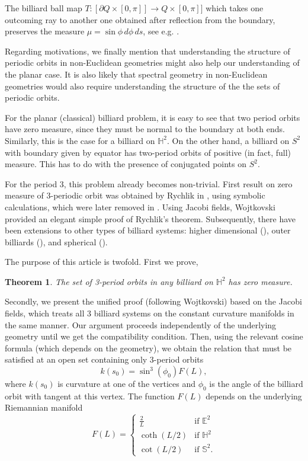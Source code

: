 \documentclass[11pt]{article}
\theoremstyle{plain}
\newtheorem{theorem}{Theorem}[section]
\theoremstyle{definition}
\begin{document}
The billiard ball map $T: [\partial Q\times [0,\pi]] \rightarrow Q\times [0,\pi]]$ which takes one outcoming ray to
another one obtained after reflection from the boundary, preserves the measure $\mu = \sin \phi\, d\phi \, ds$, see e.g.
\cite{birkhoff}.

Regarding motivations, we finally mention that understanding the structure of periodic orbits in non-Euclidean geometries
might also help our understanding of the planar case. It is also likely that spectral geometry in non-Euclidean
geometries would also require understanding the structure of the the sets of periodic orbits.


For the planar (classical) billiard problem, it is easy to see that two period orbits have zero measure,
since they must be normal to the boundary at both ends. Similarly, this is the case for a billiard on ${\mathbb H^2}$.
On the other hand, a billiard on $S^2$ with boundary given by equator has two-period orbits of positive (in fact, full)
measure. This has to do with the presence of conjugated points on $S^2$.

For the period 3, this problem already becomes non-trivial. First result on zero measure of 3-periodic orbit was
obtained by Rychlik in \cite{rychlik}, using symbolic calculations, which were later removed in \cite{stojanov}.
 Using Jacobi fields, Wojtkovski provided an elegant simple proof of Rychlik's theorem. Subsequently, there have been
extensions to other types of billiard systems: higher dimensional (\cite{vorobets}),
outer billiards (\cite{genin,tumanov}), and spherical (\cite{ymb}).

The purpose of this article is twofold. First we prove,

\begin{theorem}
The set of 3-period orbits in any billiard on ${\mathbb H^2}$ has zero measure.
\end{theorem}

Secondly, we present the unified proof (following Wojtkovski) based on the Jacobi fields,
which treats all 3 billiard systems on the constant curvature manifolds in the same manner.
Our argument proceeds independently of the underlying geometry until we get the compatibility
condition. Then, using the relevant cosine formula (which depends on the geometry), we obtain
the relation that must be satisfied at an open set containing only 3-period orbits
\[
k(s_0) =  \sin^3 (\phi_0)F(L),
\]
where $k(s_0)$ is curvature at one of the vertices and $\phi_0$ is the angle of the billiard orbit with tangent at this vertex.
The function $F(L)$ depends on the underlying Riemannian manifold
\[
 F(L) =
  \begin{cases}
   \frac{2}{L} & \text{if }  {\mathbb E^2} \\
   \coth(L/2)    & \text{if } {\mathbb H^2}  \\
   \cot(L/2)    & \text{if }  {\mathbb S^2}.
  \end{cases}
\]
\end{document}

